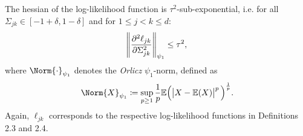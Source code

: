 \begin{condition}\label{Hessian statistical noise}
    The hessian of the log-likelihood function is $\tau^2$-sub-exponential, i.e. for all $\Sigma_{jk} \in [-1+\delta, 1-\delta]$ and for $1\leq j < k \leq d$:
    \begin{equation}
        \norm{\frac{\partial^2\ell_{jk}}{\partial \Sigma_{jk}^{2}}}_{\psi_{1}} \leq \tau^2,
    \end{equation}
    where $\Norm{\cdot}_{\psi_{1}}$ denotes the \textit{Orlicz} $\psi_{1}$-norm, defined as
    \begin{equation*}
        \Norm{X}_{\psi_{1}} \coloneqq \sup_{p\geq 1} \frac{1}{p}\mathbb{E}\Big(\abs{X - \mathbb{E}(X)}^p\Big)^{\frac{1}{p}}.
    \end{equation*}
    Again, $\ell_{jk}$ corresponds to the respective log-likelihood functions in Definitions 2.3 and 2.4.%
    

\end{condition}
